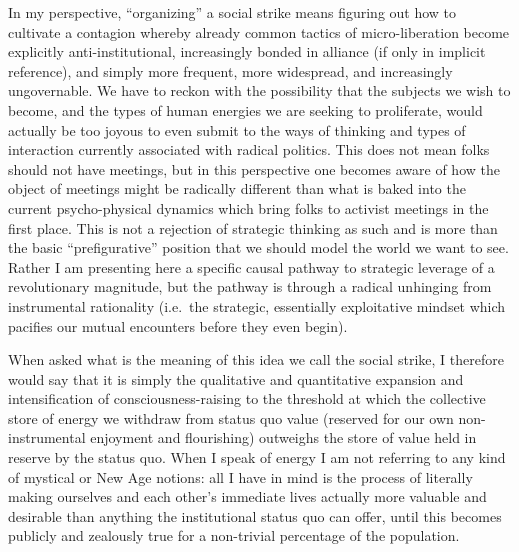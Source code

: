 \documentclass[a4paper,12pt,margin=.5in]{article}
\begin{document}
In my perspective, ``organizing'' a social strike means figuring out how
to cultivate a contagion whereby already common tactics of
micro-liberation become explicitly anti-institutional, increasingly
bonded in alliance (if only in implicit reference), and simply more
frequent, more widespread, and increasingly ungovernable. We have to
reckon with the possibility that the subjects we wish to become, and the
types of human energies we are seeking to proliferate, would actually be
too joyous to even submit to the ways of thinking and types of
interaction currently associated with radical politics. This does not
mean folks should not have meetings, but in this perspective one becomes
aware of how the object of meetings might be radically different than
what is baked into the current psycho-physical dynamics which bring
folks to activist meetings in the first place. This is not a rejection
of strategic thinking as such and is more than the basic
``prefigurative'' position that we should model the world we want to
see. Rather I am presenting here a specific causal pathway to strategic
leverage of a revolutionary magnitude, but the pathway is through a
radical unhinging from instrumental rationality (i.e.~the strategic,
essentially exploitative mindset which pacifies our mutual encounters
before they even begin).

When asked what is the meaning of this idea we call the social strike, I
therefore would say that it is simply the qualitative and quantitative
expansion and intensification of consciousness-raising to the threshold
at which the collective store of energy we withdraw from status quo
value (reserved for our own non-instrumental enjoyment and flourishing)
outweighs the store of value held in reserve by the status quo. When I
speak of energy I am not referring to any kind of mystical or New Age
notions: all I have in mind is the process of literally making ourselves
and each other's immediate lives actually more valuable and desirable
than anything the institutional status quo can offer, until this becomes
publicly and zealously true for a non-trivial percentage of the
population.
\end{document}
